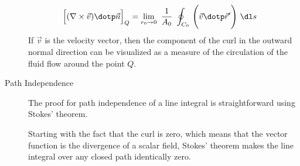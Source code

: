 \begin{description}
        \begin{align}
            \Big[(\nabla \times \vec{v}) \dotp \vec{n}\Big]_Q
             & = \lim_{r_0 \to 0}
            \ \frac{1}{A_0}\ \oint_{C_0}\ \Biggl( \vec{v} \dotp \vec{r}'
            \Biggr)\ \dl s
        \end{align}
        If $ \vec{v} $ is the velocity vector, then the component of the curl in the
        outward normal direction can be visualized as a measure of the circulation of
        the fluid flow around the point $ Q $.

    \item[Path Independence] The proof for path independence of a line integral is
        straightforward using Stokes' theorem. \par
        Starting with the fact that the curl is zero, which means that the vector
        function is the divergence of a scalar field, Stokes' theorem makes the
        line integral over any closed path identically zero. \par
\end{description}